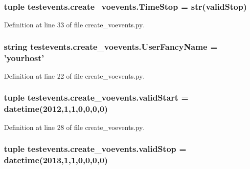 \hypertarget{namespacetestevents_1_1create__voevents_a2ba47c08e33102e401a760206d7d1fe7}{
\subsubsection[{Time\-Stop}]{\setlength{\rightskip}{0pt plus 5cm}tuple testevents.\-create\-\_\-voevents.\-Time\-Stop = str({\bf valid\-Stop})}}\label{namespacetestevents_1_1create__voevents_a2ba47c08e33102e401a760206d7d1fe7}


Definition at line 33 of file create\-\_\-voevents.\-py.

\hypertarget{namespacetestevents_1_1create__voevents_ac24452ad8ddb38fa85ee46742e8ea754}{
\subsubsection[{User\-Fancy\-Name}]{\setlength{\rightskip}{0pt plus 5cm}string testevents.\-create\-\_\-voevents.\-User\-Fancy\-Name = 'yourhost'}}\label{namespacetestevents_1_1create__voevents_ac24452ad8ddb38fa85ee46742e8ea754}


Definition at line 22 of file create\-\_\-voevents.\-py.

\hypertarget{namespacetestevents_1_1create__voevents_a9ea0cae1b844a0d1b5ff6fae78565167}{
\subsubsection[{valid\-Start}]{\setlength{\rightskip}{0pt plus 5cm}tuple testevents.\-create\-\_\-voevents.\-valid\-Start = datetime(2012,1,1,0,0,0,0)}}\label{namespacetestevents_1_1create__voevents_a9ea0cae1b844a0d1b5ff6fae78565167}


Definition at line 28 of file create\-\_\-voevents.\-py.

\hypertarget{namespacetestevents_1_1create__voevents_a80fe94b0ac338bc706910bebac4132aa}{
\subsubsection[{valid\-Stop}]{\setlength{\rightskip}{0pt plus 5cm}tuple testevents.\-create\-\_\-voevents.\-valid\-Stop = datetime(2013,1,1,0,0,0,0)}}\label{namespacetestevents_1_1create__voevents_a80fe94b0ac338bc706910bebac4132aa}


